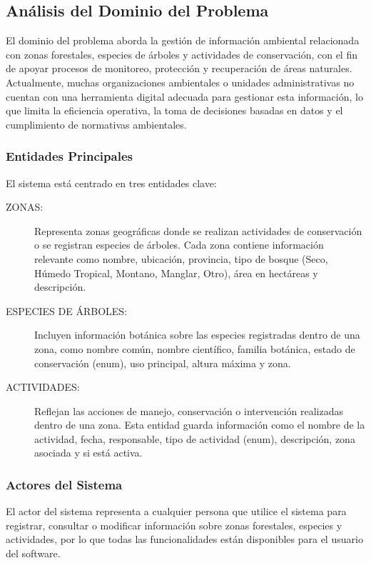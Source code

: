 \subsection{Análisis del Dominio del Problema}
El dominio del problema aborda la gestión de información ambiental relacionada con zonas forestales, especies de árboles y actividades de conservación, con el fin de apoyar procesos de monitoreo, protección y recuperación de áreas naturales. Actualmente, muchas organizaciones ambientales o unidades administrativas no cuentan con una herramienta digital adecuada para gestionar esta información, lo que limita la eficiencia operativa, la toma de decisiones basadas en datos y el cumplimiento de normativas ambientales.

\subsubsection{Entidades Principales}
El sistema está centrado en tres entidades clave:
\begin{description}
    \item[ZONAS:] Representa zonas geográficas donde se realizan actividades de conservación o se registran especies de árboles. Cada zona contiene información relevante como nombre, ubicación, provincia, tipo de bosque (Seco, Húmedo Tropical, Montano, Manglar, Otro), área en hectáreas y descripción.
    \item[ESPECIES DE ÁRBOLES:] Incluyen información botánica sobre las especies registradas dentro de una zona, como nombre común, nombre científico, familia botánica, estado de conservación (enum), uso principal, altura máxima y zona.
    \item[ACTIVIDADES:] Reflejan las acciones de manejo, conservación o intervención realizadas dentro de una zona. Esta entidad guarda información como el nombre de la actividad, fecha, responsable, tipo de actividad (enum), descripción, zona asociada y si está activa.
\end{description}

\subsubsection{Actores del Sistema}
El actor del sistema representa a cualquier persona que utilice el sistema para registrar, consultar o modificar información sobre zonas forestales, especies y actividades, por lo que todas las funcionalidades están disponibles para el usuario del software.

